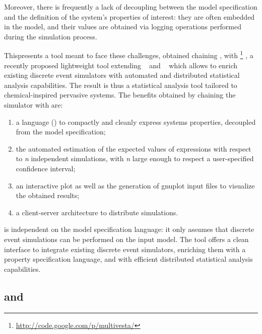 \documentclass[12pt,a4paper,twoside,openright]{book}
\begin{document}
Moreover, there is frequently a lack of decoupling between the model specification and the definition of the system's properties of interest: they are often embedded in the model, and their values are obtained via logging operations performed during the simulation process.

This\levelText{}presents a tool meant to face these challenges, obtained chaining \alchemist{}, with \multivesta{}\footnote{\url{http://code.google.com/p/multivesta/}} \cite{multivesta}, a recently proposed lightweight tool extending \vesta{}~\cite{Sen:2005} and \pvesta{}~\cite{AlTurkiM11} which allows to enrich existing discrete event simulators with automated and distributed statistical analysis capabilities.
%
The result is thus a statistical analysis tool tailored to chemical-inspired pervasive systems.
%
The benefits obtained by chaining the simulator with \multivesta{} are:
\begin{enumerate}
 \item a language (\multiquatex) to compactly and cleanly express systems properties, decoupled from the model specification;
 \item the automated estimation of the expected values of \multiquatex{} expressions with respect to \emph{n} independent simulations, with \emph{n} large enough to respect a user-specified confidence interval;
 \item an interactive plot as well as the generation of gnuplot input files to visualize the obtained results;
 \item a client-server architecture to distribute simulations.
\end{enumerate}

\multivesta{} \cite{multivesta} is independent on the model specification language: it only assumes that discrete event simulations can be performed on the input model.
%
The tool offers a clean interface to integrate existing discrete event simulators, enriching them with a property specification language, and with efficient distributed statistical analysis capabilities.

\subsection{\multivesta{} and \multiquatex{}}
\end{document}
